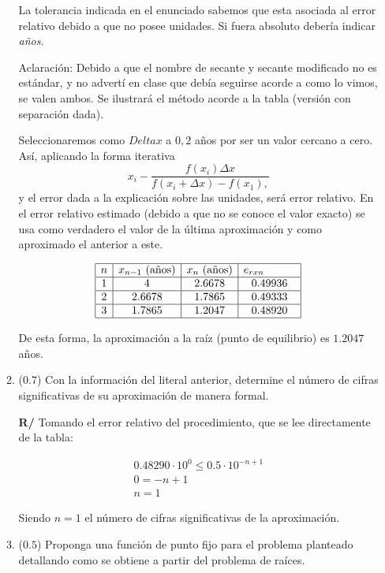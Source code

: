 \documentclass[12pt]{article}
\begin{document}
\begin{enumerate}[leftmargin=*,widest=9]
\begin{enumerate}[label=\alph*]
    La tolerancia indicada en el enunciado sabemos que esta asociada al error relativo debido a que no posee unidades. Si fuera absoluto debería indicar \textit{años}.

    Aclaración: Debido a que el nombre de secante y secante modificado no es estándar, y no advertí en clase que debía seguirse acorde a como lo vimos, se valen ambos. Se ilustrará el método acorde a la tabla (versión con separación dada).

    Seleccionaremos como \(Delta x\) a \(0,2\) años por ser un valor cercano a cero. Así, aplicando la forma iterativa \[x_i - \frac{f(x_i)\Delta x}{f(x_i + \Delta x) - f(x_1),}\] y el error dada a la explicación sobre las unidades, será error relativo. En el error relativo estimado (debido a que no se conoce el valor exacto) se usa como verdadero el valor de la última aproximación y como aproximado el anterior a este.

    \[
    \begin{array}{|c|c|c|c|}
    \hline
    n & x_{n-1} \text{ (años)} & x_n \text{ (años)} & e_{rxn} \hspace*{1cm}\\
    \hline
    1 & 4 & 2.6678 & 0.49936\\
    \hline
    2 & 2.6678 & 1.7865 & 0.49333\\
    \hline
    3 & 1.7865 & 1.2047 & 0.48920\\
    \hline
    \end{array}
    \]

    De esta forma, la aproximación a la raíz (punto de equilibrio) es \(1.2047\) años.


    \item (\(0.7\)) Con la información del literal anterior, determine el número de cifras significativas de su aproximación de manera formal.


\textbf{R/} Tomando el error relativo del procedimiento, que se lee directamente de la tabla:

\begin{eqnarray*}
0.48290 \cdot 10^0 \leq 0.5 \cdot 10^{-n+1}\\
0 = -n + 1\\
n = 1
\end{eqnarray*}

Siendo \(n=1\) el número de cifras significativas de la aproximación.

    \item (\(0.5\)) Proponga una función de punto fijo para el problema planteado detallando como se obtiene a partir del problema de raíces.



\end{enumerate}
\end{enumerate}
\end{document}

